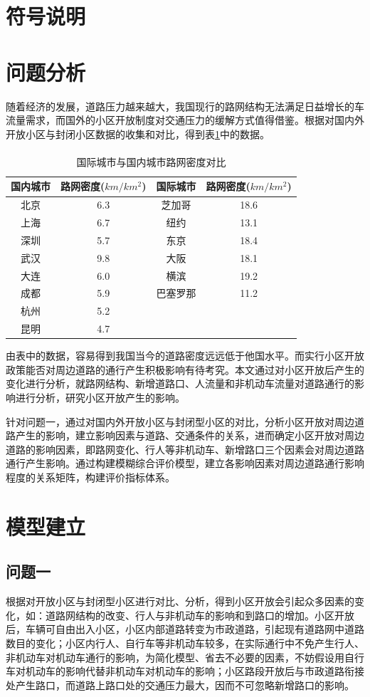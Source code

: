 \documentclass[fontset=windows,a4paper,12pt]{ctexart}
\newcommand{\upcite}[1]{\textsuperscript{\textsuperscript{\cite{#1}}}}
\begin{document}
  \section{符号说明}
  \section{问题分析}
  随着经济的发展，道路压力越来越大，我国现行的路网结构无法满足日益增长的车流量需求，而国外的小区开放制度对交通压力的缓解方式值得借鉴。根据对国内外开放小区与封闭小区数据的收集和对比，得到表\ref{tab:net_density}中的数据。
  \begin{table}[!htbp]
	\centering
	\caption{国际城市与国内城市路网密度对比\upcite{国外街区制是如何完美炼成}}
	\label{tab:net_density}
	\begin{tabular}{cc|cc}
		\hline 
		国内城市 & 路网密度($km/km^2$) & 国际城市 & 路网密度($km/km^2$) \\ 
		\hline 
		北京 & 6.3 & 芝加哥 & 18.6 \\ 
		上海 & 6.7 & 纽约 & 13.1 \\ 
		深圳 & 5.7 & 东京 & 18.4 \\ 
		武汉 & 9.8 & 大阪 & 18.1 \\ 
		大连 & 6.0 & 横滨 & 19.2 \\ 
		成都 & 5.9 & 巴塞罗那 & 11.2 \\ 
		杭州 & 5.2 &  &  \\ 
		昆明 & 4.7 &  &  \\ 
		\hline 
	\end{tabular} 
  \end{table}
  
  由表中的数据，容易得到我国当今的道路密度远远低于他国水平。而实行小区开放政策能否对周边道路的通行产生积极影响有待考究。本文通过对小区开放后产生的变化进行分析，就路网结构、新增道路口、人流量和非机动车流量对道路通行的影响进行分析，研究小区开放产生的影响。
  
  针对问题一，通过对国内外开放小区与封闭型小区的对比，分析小区开放对周边道路产生的影响，建立影响因素与道路、交通条件的关系，进而确定小区开放对周边道路的影响因素，即路网变化、行人等非机动车、新增路口三个因素会对周边道路通行产生影响。通过构建模糊综合评价模型，建立各影响因素对周边道路通行影响程度的关系矩阵，构建评价指标体系。
  \section{模型建立}
	  
	\subsection{问题一}
		根据对开放小区与封闭型小区进行对比、分析，得到小区开放会引起众多因素的变化，如：道路网结构的改变、行人与非机动车的影响和到路口的增加。小区开放后，车辆可自由出入小区，小区内部道路转变为市政道路，引起现有道路网中道路数目的变化；小区内行人、自行车等非机动车较多，在实际通行中不免产生行人、非机动车对机动车通行的影响，为简化模型、省去不必要的因素，不妨假设用自行车对机动车的影响代替非机动车对机动车的影响；小区路段开放后与市政道路衔接处产生路口，而道路上路口处的交通压力最大，因而不可忽略新增路口的影响。
\end{document}
